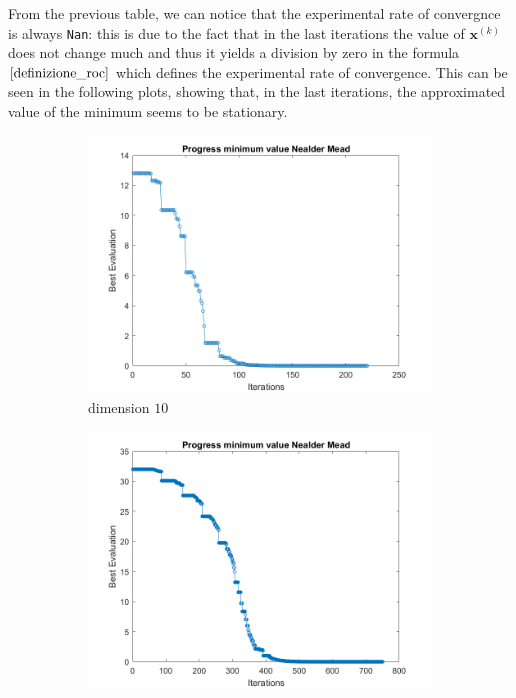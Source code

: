 From the previous table, we can notice that the experimental rate of convergnce is always \verb+Nan+: this is due to the fact that in the last iterations the value of $\mathbf{x}^{(k)}$ does not change much and thus it yields a division by zero in the formula $\eqref{definizione_roc}$ which defines the experimental rate of convergence.
This can be seen in the following plots, showing that, in the last iterations, the approximated value of the minimum seems to be stationary.
\begin{figure}[htbp]
    \centering
    \begin{subfigure}[t]{0.35\textwidth}  %
        \centering
        \includegraphics[width=\textwidth]{img/pb76_SX_es10.png}
        \caption{dimension $10$}
        \label{fig:R6}
    \end{subfigure}
    \hspace{1cm} %
    \begin{subfigure}[t]{0.35\textwidth}
        \centering
        \includegraphics[width=\textwidth]{img/pb76_SX_es25.png}

\end{subfigure}
\end{figure}
